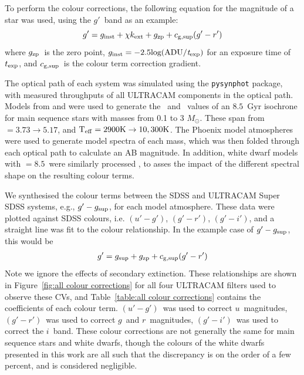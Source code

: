 
To perform the colour corrections, the following equation for the magnitude of a star was used, using the $g'$\ band as an example:
\begin{equation}
    \label{eqn:gen magnitudes}
    g' = g_{\rm inst} + \chi k_{\rm ext} + g_{\rm zp} + c_{\rm g, sup}(g'-r') 
\end{equation}
where $g_{\rm zp}$\ is the zero point, $g_{\rm inst} = -2.5 \rm log(ADU/{\it t}_{\rm exp})$
for an exposure time of $t_{\rm exp}$, and $c_{\rm g, sup}$\ is the colour term correction gradient. 

The optical path of each system was simulated using the \texttt{pysynphot} package, with measured throughputs of all ULTRACAM components in the optical path. Models from \citet{Dotter2016} and \citet{Choi2016} were used to generate the \teff\ and \logg\ values of an $8.5$\ Gyr isochrone for main sequence stars with masses from 0.1 to 3 $M_\odot$. These span from \logg $= 3.73 \to 5.17$, and $\rm{T_{eff}} = 2900K \to 10,300K$. The Phoenix model atmospheres \citep{allard2012} were used to generate model spectra of each mass, which was then folded through each optical path to calculate an AB magnitude. In addition, white dwarf models with \logg$=8.5$\ were similarly processed \citep{koester2010, tremblay2009}, to asses the impact of the different spectral shape on the resulting colour terms.

We synthesised the colour terms between the SDSS and ULTRACAM Super SDSS systems, e.g., $g'-g_{\rm sup}$, for each model atmosphere. These data were plotted against SDSS colours, i.e. $(u'-g')$, $(g'-r')$, $(g'-i')$, and a straight line was fit to the colour relationship. In the example case of $g'-g_{\rm sup}$, this would be
\begin{align*}
    g' &= g_{\rm sup} + g_{\rm zp} + c_{\rm g, sup}(g'-r') \\
\end{align*}
Note we ignore the effects of secondary extinction. 
These relationships are shown in Figure~\ref{fig:all colour corrections} for all four ULTRACAM filters used to observe these CVs, and Table~\ref{table:all colour corrections} contains the coefficients of each colour term.
$(u'-g')$\ was used to correct $u$\ magnitudes, $(g'-r')$\ was used to correct $g$\ and $r$\ magnitudes, $(g'-i')$\ was used to correct the $i$\ band.
These colour corrections are not generally the same for main sequence stars and white dwarfs, though the colours of the white dwarfs presented in this work are all such that the discrepancy is on the order of a few percent, and is considered negligible.

